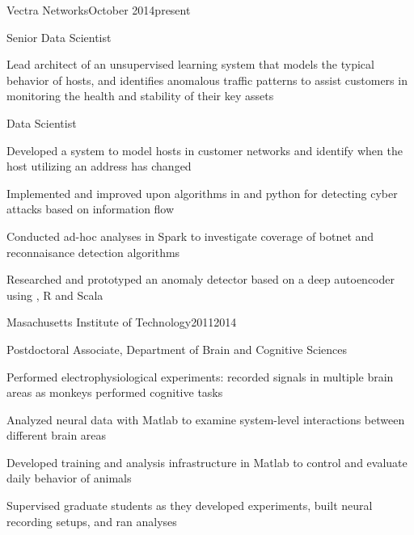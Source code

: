 \documentclass{report}
\begin{document}
  \begin{work_location}{Vectra Networks}{October 2014}{present}

    \begin{position}{Senior Data Scientist}
      \item Lead architect of an unsupervised learning system that models the typical behavior of hosts, and identifies anomalous traffic patterns to assist customers in monitoring the health and stability of their key assets
    \end{position}

    \begin{position}{Data Scientist}
      \item Developed a system to model hosts in customer networks and identify when the host utilizing an address has changed
      \item Implemented and improved upon algorithms in \CC{} and python for detecting cyber attacks based on information flow
      \item Conducted ad-hoc analyses in Spark to investigate coverage of botnet and reconnaisance detection algorithms
      \item Researched and prototyped an anomaly detector based on a deep autoencoder using \HzO{}, R and Scala
    \end{position}

  \end{work_location}



  \begin{work_location}{Masachusetts Institute of Technology}{2011}{2014}

    \begin{position}{Postdoctoral Associate, Department of Brain and Cognitive Sciences}
      \item {} Performed electrophysiological experiments: recorded signals in multiple brain areas as monkeys performed cognitive tasks
      \item Analyzed neural data with Matlab to examine system-level interactions between different brain areas
      \item Developed training and analysis infrastructure in Matlab to control and evaluate daily behavior of animals
      \item Supervised graduate students as they developed experiments, built neural recording setups, and ran analyses
    \end{position}

  \end{work_location}
\end{document}
